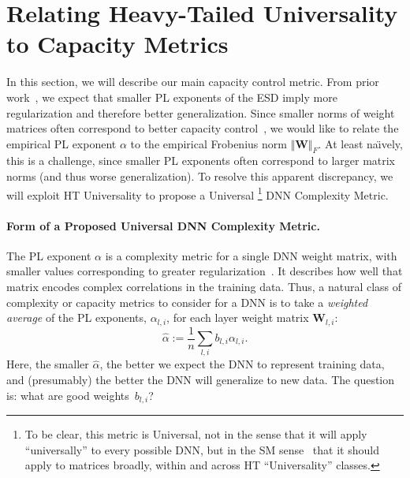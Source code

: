 \section{Relating Heavy-Tailed Universality to Capacity Metrics}
\label{sxn:theory-new}

In this section, we will describe our main capacity control metric.
%
From prior work~\cite{MM18_TR}, we expect that smaller PL exponents of the ESD imply more regularization and therefore better generalization. 
Since smaller norms of weight matrices often correspond to better capacity control~\cite{LMBx18_TR,SHNx17_TR,PLMx18_TR,BFT17_TR}, we would like to relate the empirical PL exponent $\alpha$ to the empirical Frobenius norm $\Vert\mathbf{W}\Vert_{F}$.
At least na\"{\i}vely, this is a challenge, since smaller PL exponents often correspond to larger matrix norms (and thus worse generalization).
To resolve this apparent discrepancy, we will exploit HT Universality to propose a Universal%
\footnote{To be clear, this metric is Universal, not in the sense that it will apply ``universally'' to every possible DNN, but in the SM sense~\cite{SornetteBook,BouchaudPotters03} that it should apply to matrices broadly, within and across HT ``Universality'' classes.}
DNN Complexity Metric.


\paragraph{Form of a Proposed Universal DNN Complexity Metric.} 

The PL exponent $\alpha$ is a complexity metric for a single DNN weight matrix, with smaller values corresponding to greater regularization~\cite{MM18_TR}.
It describes how well that matrix encodes complex correlations in the training data.
Thus, a natural class of complexity or capacity metrics to consider for a DNN is to take a \emph{weighted average} of the PL exponents, $\alpha_{l,i}$, for each layer weight matrix $\mathbf{W}_{l,i}$:
\begin{equation}
\hat{\alpha}:=\dfrac{1}{n}\sum_{l,i}b_{l,i}\alpha_{l,i}  .
\label{eqn:alpha_hat_generic}
\end{equation}
Here, the smaller $\hat{\alpha}$, the better we expect the DNN to represent training data, and (presumably) the better the DNN will generalize to new data.
The question is: what are good weights~$b_{l,i}$?

